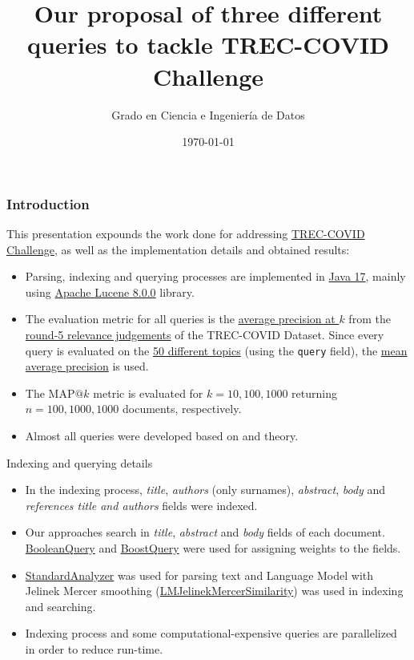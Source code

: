 \documentclass[10pt]{beamer}
\title{Our proposal of three different queries to tackle TREC-COVID Challenge}
\author{Grado en Ciencia e Ingeniería de Datos}
\institute{Universidade da Coruña}
\date{\today}
\begin{document}
\frame{\titlepage}

\begin{frame}
    \frametitle{Introduction}
    This presentation expounds the work done for addressing \href{https://ir.nist.gov/trec-covid/}{TREC-COVID Challenge}, as well as the implementation details and obtained results:

    \begin{itemize}
        \item Parsing, indexing and querying processes are implemented in \href{https://www.oracle.com/java/technologies/javase/jdk17-archive-downloads.html}{Java 17}, mainly using \href{https://lucene.apache.org/}{Apache Lucene 8.0.0} library. 
        \item The evaluation metric for all queries is the \href{https://amitness.com/2020/08/information-retrieval-evaluation/\#2-average-precisionap}{average precision at $k$} from the \href{https://ir.nist.gov/trec-covid/data/qrels-covid_d5_j0.5-5.txt}{round-5 relevance judgements} of the TREC-COVID Dataset. Since every query is  evaluated on the \href{https://ir.nist.gov/trec-covid/data/topics-rnd5.xml}{50 different topics} (using the \texttt{query} field), the \href{https://blog.paperspace.com/mean-average-precision/}{mean average precision} is used.
        \item The MAP$@k$ metric is evaluated for $k=10, 100, 1000$ returning $n=100, 1000, 1000$ documents, respectively.
        \item Almost all queries were developed based on \cite{schutze2008introduction} and \cite{croft2010search} theory.
    \end{itemize}
\end{frame}

\begin{frame}{Indexing and querying details}
    \begin{itemize}
        \item In the indexing process, \textit{title}, \textit{authors} (only surnames), \textit{abstract}, \textit{body} and \textit{references title and authors} fields were indexed.
        \item Our approaches search in \textit{title}, \textit{abstract} and \textit{body} fields of each document. \href{https://lucene.apache.org/core/8_9_0/core/org/apache/lucene/search/BooleanQuery.html}{BooleanQuery} and \href{https://lucene.apache.org/core/7_4_0/core/org/apache/lucene/search/BoostQuery.html}{BoostQuery} were used for assigning weights to the fields.
        \item \href{https://lucene.apache.org/core/9_0_0/core/org/apache/lucene/analysis/standard/StandardAnalyzer.html}{StandardAnalyzer} was used for parsing text and Language Model with Jelinek Mercer smoothing (\href{https://lucene.apache.org/core/8_6_2/core/org/apache/lucene/search/similarities/LMJelinekMercerSimilarity.html}{LMJelinekMercerSimilarity}) was used in indexing and searching.
        \item Indexing process and some computational-expensive queries are parallelized in order to reduce run-time.
    \end{itemize}
\end{frame}
\end{document}
